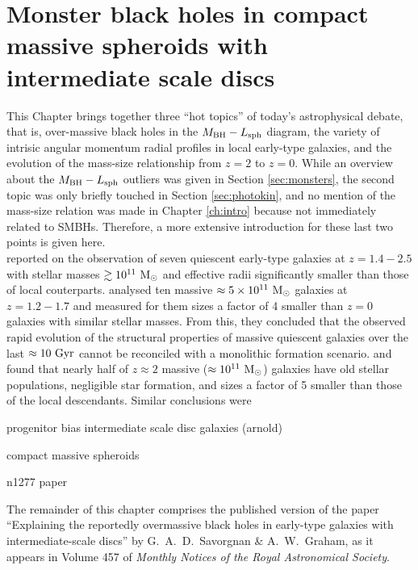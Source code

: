 \chapter{Monster black holes in compact massive spheroids with intermediate scale discs}
\label{ch:ellic}

This Chapter brings together three ``hot topics'' of today's astrophysical debate, 
that is, over-massive black holes in the $M_{\rm BH} - L_{\rm sph}$ diagram, 
the variety of intrisic angular momentum radial profiles in local early-type galaxies, 
and the evolution of the mass-size relationship from $z=2$ to $z=0$. 
While an overview about the $M_{\rm BH} - L_{\rm sph}$ outliers was given in Section \ref{sec:monsters}, 
the second topic was only briefly touched in Section \ref{sec:photokin}, 
and no mention of the mass-size relation was made in Chapter \ref{ch:intro} 
because not immediately related to SMBHs. 
Therefore, a more extensive introduction for these last two points is given here. \\ 

\citet{daddi2005} reported on the observation of seven quiescent early-type galaxies 
at $z=1.4-2.5$ with stellar masses $\gtrsim 10^{11} \rm~M_\odot$ 
and effective radii significantly smaller than those of local couterparts. 
\citet{trujillo2006} analysed ten massive $\approx 5 \times 10^{11} \rm~M_\odot$ galaxies at $z=1.2-1.7$ 
and measured for them sizes a factor of 4 smaller than $z=0$ galaxies with similar stellar masses. 
From this, they concluded that the observed rapid evolution of the structural properties of massive quiescent galaxies 
over the last $\approx 10 \rm~Gyr$ 
cannot be reconciled with a monolithic formation scenario. 
\citet{kriek2008} and \citet{vandokkum2008} found that nearly half of $z \approx 2$ 
massive ($\approx 10^{11} \rm~M_\odot$) galaxies 
have old stellar populations, negligible star formation, and sizes a factor of 5 smaller than 
those of the local descendants. 
Similar conclusions were 
 
progenitor bias
intermediate scale disc galaxies (arnold)

compact massive spheroids

n1277 paper


The remainder of this chapter comprises the published version of the paper 
``Explaining the reportedly overmassive black holes in early-type galaxies with intermediate-scale discs'' 
by G.~A.~D.~Savorgnan \& A.~W.~Graham,  
as it appears in Volume 457 of \emph{Monthly Notices of the Royal Astronomical Society}. 


